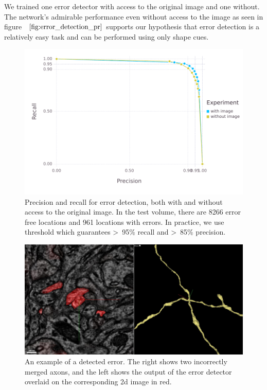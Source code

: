 \documentclass{article}
\begin{document}
We trained one error detector with access to the original image and one without. The network's admirable performance even without access to the image as seen in figure ~$\ref{fig:error_detection_pr}$ supports our hypothesis that error detection is a relatively easy task and can be performed using only shape cues.
\begin{figure}
\begin{center}
	\includegraphics[width=0.65\linewidth]{pr.pdf}
	\caption{Precision and recall for error detection, both with and without access to the original image. In the test volume, there are 8266 error free locations and 961 locations with errors. In practice, we use threshold which guarantees >~95\% recall and >~85\% precision.}
	\label{fig:error_detection_pr}
\end{center}
\end{figure}

\begin{figure}
\begin{center}
	\includegraphics[width=0.65\linewidth]{x_error.jpg}
	\caption{An example of a detected error. The right shows two incorrectly merged axons, and the left shows the output of the error detector overlaid on the corresponding 2d image in red.}
	\label{fig:x_error}
\end{center}
\end{figure}
\end{document}
